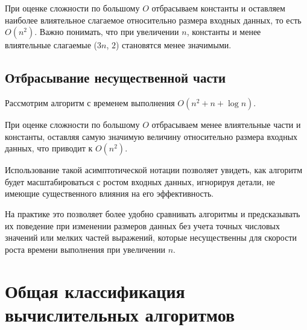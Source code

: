 При оценке сложности по большому $O$ отбрасываем константы и оставляем 
наиболее влиятельное слагаемое относительно размера входных данных, то есть $O(n^2)$.
Важно понимать, что при увеличении $n$, константы и менее 
влиятельные слагаемые ($3n$, $2$) становятся менее значимыми.

\subsection{Отбрасывание несущественной части}
Рассмотрим алгоритм с временем выполнения $O(n^2 + n + \log{n})$.

При оценке сложности по большому $O$ отбрасываем менее влиятельные части и 
константы, оставляя самую значимую величину относительно размера входных 
данных, что приводит к $O(n^2)$.

Использование такой асимптотической нотации позволяет увидеть, как алгоритм 
будет масштабироваться с ростом входных данных, игнорируя детали, не имеющие 
существенного влияния на его эффективность.

На практике это позволяет более удобно сравнивать алгоритмы и предсказывать 
их поведение при изменении размеров данных без учета точных числовых значений 
или мелких частей выражений, которые несущественны для скорости роста времени 
выполнения при увеличении $n$.

\section{Общая классификация вычислительных алгоритмов}



